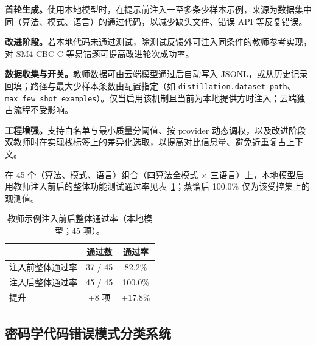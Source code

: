 \documentclass[12pt]{llncs}
\begin{document}
\textbf{首轮生成。}使用本地模型时，在提示前注入一至多条少样本示例，来源为数据集中同（算法、模式、语言）的通过代码，以减少缺头文件、错误 API 等反复错误。

\textbf{改进阶段。}若本地代码未通过测试，除测试反馈外可注入同条件的教师参考实现，对 SM4-CBC C 等易错题可提高改进轮次成功率。

\textbf{数据收集与开关。}教师数据可由云端模型通过后自动写入 JSONL，或从历史记录回填；路径与最大少样本条数由配置指定（如 \texttt{distillation.dataset\_path}、\texttt{max\_few\_shot\_examples}）。仅当启用该机制且当前为本地提供方时注入；云端独占流程不受影响。

\textbf{工程增强。}支持白名单与最小质量分阈值、按 provider 动态调权，以及改进阶段双教师时在实现栈标签上的差异化选取，以提高对比信息量、避免近重复占上下文。

在 45 个（算法、模式、语言）组合（四算法全模式 × 三语言）上，本地模型启用教师注入前后的整体功能测试通过率见表~\ref{tab:distillation_overall}；蒸馏后 100.0\% 仅为该受控集上的观测值。
\begin{table}[H]
  \centering
  \footnotesize
  \caption{教师示例注入前后整体通过率（本地模型；45 项）。}
  \label{tab:distillation_overall}
  \begin{tabular}{l c c}
    \toprule
    & 通过数 & 通过率 \\
    \midrule
    注入前整体通过率 & 37 / 45 & 82.2\% \\
    注入后整体通过率 & 45 / 45 & 100.0\% \\
    提升             & +8 项   & +17.8\% \\
    \bottomrule
  \end{tabular}
\end{table}

\subsection{密码学代码错误模式分类系统}
\end{document}
